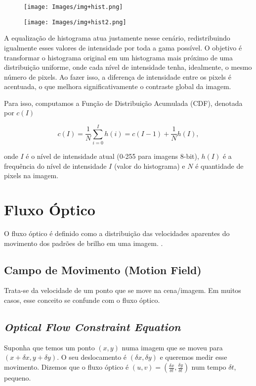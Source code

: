\documentclass[12pt, a4paper]{article}
\begin{document}
\begin{figure}[H]
    \centering
    \texttt{[image: Images/img+hist.png]}
\end{figure}

\begin{figure}[H]
    \centering
    \texttt{[image: Images/img+hist2.png]}
\end{figure}

A equalização de histograma atua justamente nesse cenário, redistribuindo igualmente esses valores de intensidade por toda a gama possível. O objetivo é transformar o histograma original em um histograma mais próximo de uma distribuição uniforme, onde cada nível de intensidade tenha, idealmente, o mesmo número de pixels. Ao fazer isso, a diferença de intensidade entre os pixels é acentuada, o que melhora significativamente o contraste global da imagem.

Para isso, computamos a Função de Distribuição Acumulada (CDF), denotada por $c(I)$

\[
c(I) = \frac{1}{N}\sum_{i=0}^I h(i) = c(I-1) + \frac{1}{N}h(I),
\]

\noindent onde $I$ é o nível de intensidade atual (0-255 para imagens 8-bit), $h(I)$ é a frequência do nível de intensidade $I$ (valor do histograma) e $N$ é quantidade de pixels na imagem.

\section{Fluxo Óptico}

O fluxo óptico é definido como a distribuição das velocidades aparentes do movimento dos padrões de brilho em uma imagem. \cite{Horn1981}. 

\subsection{Campo de Movimento (Motion Field)}

Trata-se da velocidade de um ponto que se move na cena/imagem. Em muitos casos, esse conceito se confunde com o fluxo óptico. 

\subsection{\textit{Optical Flow Constraint Equation}}

Suponha que temos um ponto $(x,y)$ numa imagem que se moveu para $(x+\delta x, y+\delta y)$. O seu  deslocamento é $(\delta x, \delta y)$ e queremos medir esse movimento. Dizemos que o fluxo óptico é $(u, v) = (\frac{\delta x}{\delta t}, \frac{\delta y}{\delta t})$ num tempo $\delta t$, pequeno. \\
\end{document}
